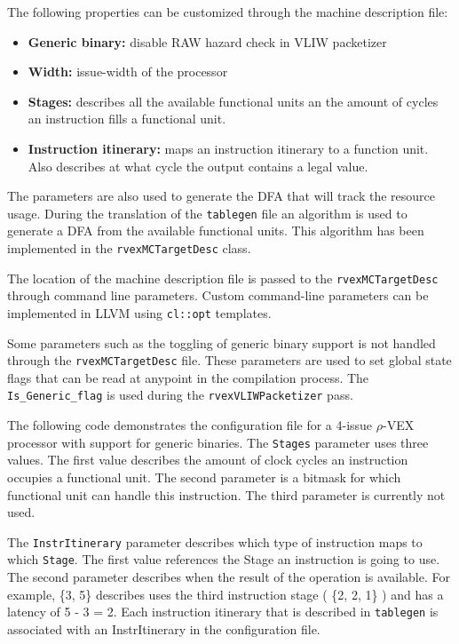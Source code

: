 The following properties can be customized through the machine description file:

\begin{itemize}
  \item \textbf{Generic binary:} disable RAW hazard check in VLIW packetizer
  \item \textbf{Width:} issue-width of the processor
  \item \textbf{Stages:} describes all the available functional units an the amount of cycles an instruction fills a functional unit.
  \item \textbf{Instruction itinerary:} maps an instruction itinerary to a function unit. Also describes at what cycle the output contains a legal value.
\end{itemize}

The parameters are also used to generate the DFA that will track the resource usage. During the translation of the \texttt{tablegen} file an algorithm is used to generate a DFA from the available functional units. This algorithm has been implemented in the \texttt{rvexMCTargetDesc} class.

The location of the machine description file is passed to the \texttt{rvexMCTargetDesc} through command line parameters. Custom command-line parameters can be implemented in LLVM using \texttt{cl::opt} templates.

Some parameters such as the toggling of generic binary support is not handled through the \texttt{rvexMCTargetDesc} file. These parameters are used to set global state flags that can be read at anypoint in the compilation process. The \texttt{Is\_Generic\_flag} is used during the \texttt{rvexVLIWPacketizer} pass.

The following code demonstrates the configuration file for a 4-issue $\rho$-VEX processor with support for generic binaries. The \texttt{Stages} parameter uses three values. The first value describes the amount of clock cycles an instruction occupies a functional unit. The second parameter is a bitmask for which functional unit can handle this instruction. The third parameter is currently not used.

The \texttt{InstrItinerary} parameter describes which type of instruction maps to which \texttt{Stage}. The first value references the Stage an instruction is going to use. The second parameter describes when the result of the operation is available. For example, \{3, 5\} describes uses the third instruction stage ( \{2, 2, 1\} ) and has a latency of 5 - 3 = 2. Each instruction itinerary that is described in \texttt{tablegen} is associated with an InstrItinerary in the configuration file.

